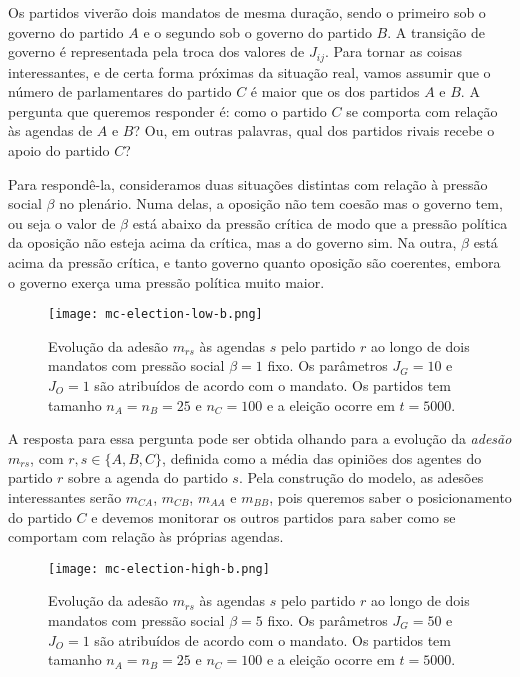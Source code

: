 Os partidos  viverão dois mandatos de mesma duração, sendo o primeiro sob o governo do partido $A$ e o segundo sob o governo do partido $B$.
A transição de governo é representada pela troca dos valores de $J_{ij}$.
Para tornar as coisas interessantes, e de certa forma próximas da situação real, vamos assumir que o número de parlamentares do partido $C$ é maior que os dos partidos $A$ e $B$.
A pergunta que queremos responder é: como o partido $C$ se comporta com relação às agendas de $A$ e $B$? Ou, em outras palavras, qual dos partidos rivais recebe o apoio do partido $C$?

Para respondê-la, consideramos duas situações distintas com relação à pressão social $\beta$ no plenário.
Numa delas, a oposição não tem coesão mas o governo tem, ou seja o valor de $\beta$ está abaixo da pressão crítica de modo que a pressão política da oposição não esteja acima da crítica, mas a do governo sim.
Na outra, $\beta$ está acima da pressão crítica, e tanto governo quanto oposição são coerentes, embora o governo exerça uma pressão política muito maior.

\begin{figure}[t!]\label{fig:mc-election-low-b}
    \centering
    \texttt{[image: mc-election-low-b.png]}
    \caption{Evolução da adesão $m_{rs}$ às agendas $s$ pelo partido $r$ ao longo de dois mandatos com pressão social $\beta=1$ fixo.
    Os parâmetros $J_G=10$ e $J_O=1$ são atribuídos de acordo com o mandato. Os partidos tem tamanho $n_A=n_B=25$ e $n_C=100$ e a eleição ocorre em $t=5000$.}
\end{figure}

A resposta para essa pergunta pode ser obtida olhando para a evolução da \emph{adesão} $m_{rs}$, com $r,s \in \{A,B,C\}$, definida como a média das opiniões dos agentes do partido $r$ sobre a agenda do partido $s$.
Pela construção do modelo, as adesões interessantes serão $m_{CA}$, $m_{CB}$, $m_{AA}$ e $m_{BB}$, pois queremos saber o posicionamento do partido $C$ e devemos monitorar os outros partidos para saber como se comportam com relação às próprias agendas.

\begin{figure}[t!]\label{fig:mc-election-high-b}
    \centering
    \texttt{[image: mc-election-high-b.png]}
    \caption{Evolução da adesão $m_{rs}$ às agendas $s$ pelo partido $r$ ao longo de dois mandatos com pressão social $\beta=5$ fixo.
Os parâmetros $J_G=50$ e $J_O=1$ são atribuídos de acordo com o mandato. Os partidos tem tamanho $n_A=n_B=25$ e $n_C=100$ e a eleição ocorre em $t=5000$.}
\end{figure}

